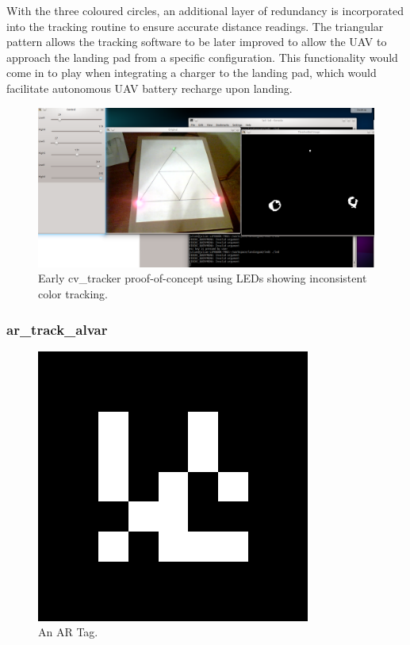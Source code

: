 With the three coloured circles, an additional layer of redundancy is incorporated into the tracking routine to ensure accurate distance readings. The triangular pattern allows the tracking software to be later improved to allow the UAV to approach the landing pad from a specific configuration. This functionality would come in to play when integrating a charger to the landing pad, which would facilitate autonomous UAV battery recharge upon landing.

\begin{figure}[tbh]
\begin{center}
\includegraphics[width=1\textwidth]{resources/img/ledtracking01}
\end{center}
\caption{Early cv\_tracker proof-of-concept using LEDs showing inconsistent color tracking.
\label{ledtracking}}
\end{figure}




\subsubsection{ar\_track\_alvar}\label{artrackalvar}

\begin{figure}[h]
\begin{center}
\includegraphics[width=.30\textwidth]{resources/img/ar_tag_01}
\end{center}
\caption{An AR Tag.
\label{ar}}
\end{figure}

